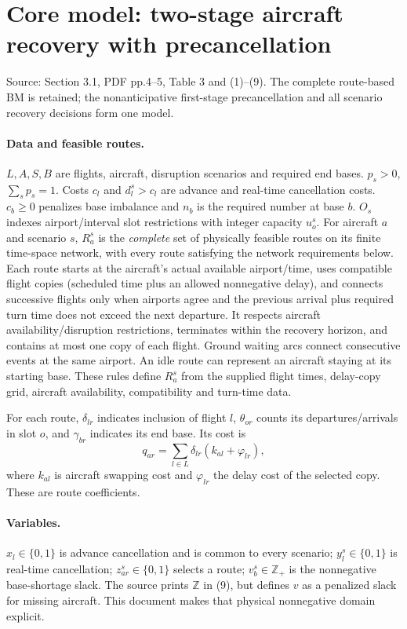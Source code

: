\documentclass[11pt]{article}
\begin{document}
\section*{Core model: two-stage aircraft recovery with precancellation}
Source: Section 3.1, PDF pp.4--5, Table 3 and (1)--(9).
The complete route-based BM is retained; the nonanticipative first-stage
precancellation and all scenario recovery decisions form one model.
\paragraph{Data and feasible routes.}
$L,A,S,B$ are flights, aircraft, disruption scenarios and required end bases.
$p_s>0$, $\sum_s p_s=1$. Costs $c_l$ and $d_l^s>c_l$ are advance and
real-time cancellation costs. $c_b\ge0$ penalizes base imbalance and
$n_b$ is the required number at base $b$. $O_s$ indexes airport/interval
slot restrictions with integer capacity $u_o^s$.
For aircraft $a$ and scenario $s$, $R_a^s$ is the \emph{complete} set of
physically feasible routes on its finite time-space network, with every route satisfying the network requirements below. Each route
starts at the aircraft's actual available airport/time, uses compatible
flight copies (scheduled time plus an allowed nonnegative delay), and
connects successive flights only when airports agree and the previous
arrival plus required turn time does not exceed the next departure.
It respects aircraft availability/disruption restrictions, terminates
within the recovery horizon, and contains at most one copy of each flight.
Ground waiting arcs connect consecutive events at the same airport.
An idle route can represent an aircraft staying at its starting base.
These rules define $R_a^s$ from the supplied flight times, delay-copy grid,
aircraft availability, compatibility and turn-time data.

For each route, $\delta_{lr}$ indicates inclusion of flight $l$,
$\theta_{or}$ counts its departures/arrivals in slot $o$, and
$\gamma_{br}$ indicates its end base. Its cost is
\[
 q_{ar}=\sum_{l\in L}\delta_{lr}(k_{al}+\varphi_{lr}),
\]
where $k_{al}$ is aircraft swapping cost and $\varphi_{lr}$ the delay
cost of the selected copy. These are route coefficients.
\paragraph{Variables.}
$x_l\in\{0,1\}$ is advance cancellation and is common to every scenario;
$y_l^s\in\{0,1\}$ is real-time cancellation;
$z_{ar}^s\in\{0,1\}$ selects a route; $v_b^s\in\mathbb Z_+$ is the
nonnegative base-shortage slack. The source prints $\mathbb Z$ in (9),
but defines $v$ as a penalized slack for missing aircraft. This document
makes that physical nonnegative domain explicit.
\end{document}
